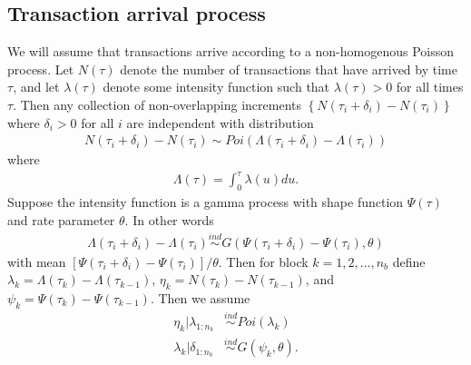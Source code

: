 \documentclass{article}
\begin{document}
\subsection{Transaction arrival process}
We will assume that transactions arrive according to a non-homogenous Poisson process. Let $N(\tau)$ denote the number of transactions that have arrived by time $\tau$, and let $\lambda(\tau)$ denote some intensity function such that $\lambda(\tau) > 0$ for all times $\tau$. Then any collection of non-overlapping increments $\left\{N(\tau_i + \delta_i) - N(\tau_i)\right\}$ where $\delta_i>0$ for all $i$ are independent with distribution
\begin{align*}
N(\tau_i + \delta_i) - N(\tau_i) \sim Poi(\Lambda(\tau_i + \delta_i) - \Lambda(\tau_i))
\end{align*}
where 
\begin{align*}
\Lambda(\tau) = \int_0^\tau \lambda(u)du.
\end{align*}
Suppose the intensity function is a gamma process with shape function $\Psi(\tau)$ and rate parameter $\theta$. In other words
\begin{align*}
\Lambda(\tau_i + \delta_i) - \Lambda(\tau_i) \stackrel{ind}{\sim} G(\Psi(\tau_i + \delta_i) - \Psi(\tau_i), \theta)
\end{align*}
with mean $[\Psi(\tau_i + \delta_i) - \Psi(\tau_i)]/\theta$. Then for block $k=1,2,\dots,n_{b}$ define $\lambda_k = \Lambda(\tau_k) - \Lambda(\tau_{k-1})$, $\eta_k = N(\tau_k) - N(\tau_{k-1})$, and $\psi_k = \Psi(\tau_k) - \Psi(\tau_{k-1})$. Then we assume
\begin{align*}
\eta_k | \lambda_{1:n_{b}} &\stackrel{ind}{\sim} Poi(\lambda_k)\\
\lambda_k|\delta_{1:n_{b}} &\stackrel{ind}{\sim} G(\psi_k, \theta).
\end{align*}
\end{document}
